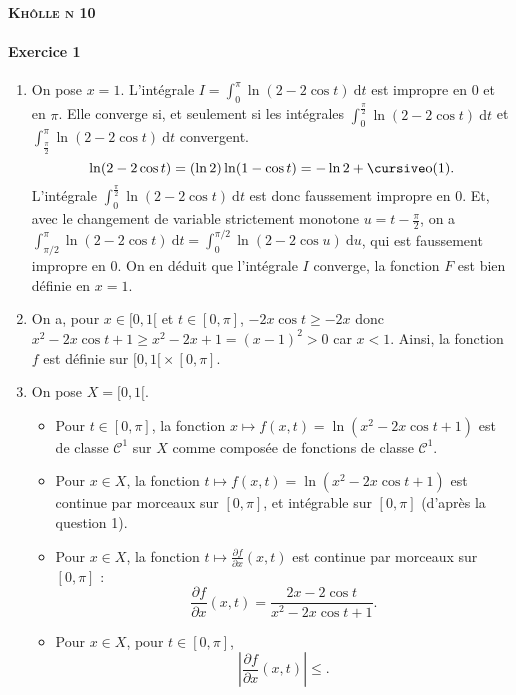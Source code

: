 \documentclass[a4paper]{article}
\begin{document}
	\begin{center}
		\bfseries\scshape\Huge Khôlle n 10
	\end{center}

	\paragraph{Exercice 1}
	\begin{enumerate}
		\item On pose $x = 1$. L'intégrale $I = \int_{0}^{\pi} \ln(2 - 2 \cos t)~\mathrm{d}t$\/ est impropre en 0 et en $\pi$. Elle converge si, et seulement si les intégrales $\int_{0}^{\frac{\pi}{2}} \ln(2 - 2 \cos t)~\mathrm{d}t$\/ et $\int_{\frac{\pi}{2}}^{\pi} \ln(2 - 2 \cos t)~\mathrm{d}t$\/ convergent.
			\[
				\ln(2 - 2 \cos t) = (\ln 2) \ln(1 - \cos t) = -\ln 2 + \po(1)
			.\]
			L'intégrale $\int_{0}^{\frac{\pi}{2}} \ln(2 - 2 \cos t)~\mathrm{d}t$\/ est donc faussement impropre en 0. Et, avec le changement de variable strictement monotone $u = t- \frac{\pi}{2}$, on a $\int_{\pi / 2}^{\pi} \ln(2 - 2\cos t)~\mathrm{d}t = \int_{0}^{\pi / 2} \ln (2 - 2 \cos u)~\mathrm{d}u$, qui est faussement impropre en 0. On en déduit que l'intégrale $I$\/ converge, la fonction $F$\/ est bien définie en $x = 1$.
		\item On a, pour $x \in [0,1[$\/ et $t \in [0,\pi]$, $-2x \cos t \ge -2x$\/ donc $x^2 - 2x \cos t + 1 \ge x^2 - 2x + 1 = (x - 1)^2 > 0$\/ car $x < 1$. Ainsi, la fonction $f$\/ est définie sur ${[0,1[} \times  [0,\pi]$.
		\item
			On pose $X = [0,1[$.
			\begin{itemize}
				\item Pour $t \in [0,\pi]$, la fonction $x \mapsto f(x,t) = \ln(x^2 - 2x \cos t + 1)$\/ est de classe $\mathcal{C}^1$\/ sur $X$\/ comme composée de fonctions de classe $\mathcal{C}^1$.
				\item Pour $x \in X$, la fonction $t \mapsto f(x,t) = \ln(x^2 - 2x \cos t + 1)$\/ est continue par morceaux sur $[0,\pi]$, et intégrable sur $[0,\pi]$\/ (d'après la question 1).
				\item Pour $x \in X$, la fonction $t \mapsto \frac{\partial f}{\partial x}(x,t)$\/ est continue par morceaux sur $[0,\pi]$ : \[
						\frac{\partial f}{\partial x}(x,t) = \frac{2x - 2 \cos t}{x^2 - 2x \cos t + 1}
					.\]
				\item Pour $x \in X$, pour $t \in [0,\pi]$, \[
					\left|\frac{\partial f}{\partial x}(x,t)\right| \le 
				.\] 
			\end{itemize}
	\end{enumerate}
\end{document}
